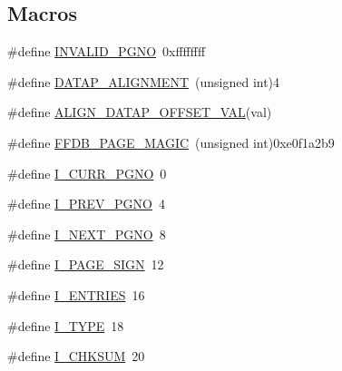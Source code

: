 \subsection*{Macros}
\begin{DoxyCompactItemize}
\item 
\#define \mbox{\hyperlink{adat-devel_2other__libs_2filedb_2filehash_2ffdb__page_8h_a4dac599d4a7d7303608039932d892590}{I\+N\+V\+A\+L\+I\+D\+\_\+\+P\+G\+NO}}~0xffffffff
\item 
\#define \mbox{\hyperlink{adat-devel_2other__libs_2filedb_2filehash_2ffdb__page_8h_a442c3bfb4646a5dd8036ddefcc3c0ed6}{D\+A\+T\+A\+P\+\_\+\+A\+L\+I\+G\+N\+M\+E\+NT}}~(unsigned int)4
\item 
\#define \mbox{\hyperlink{adat-devel_2other__libs_2filedb_2filehash_2ffdb__page_8h_a4892e3ca5c8bfe2debc90616321bf199}{A\+L\+I\+G\+N\+\_\+\+D\+A\+T\+A\+P\+\_\+\+O\+F\+F\+S\+E\+T\+\_\+\+V\+AL}}(val)
\item 
\#define \mbox{\hyperlink{adat-devel_2other__libs_2filedb_2filehash_2ffdb__page_8h_aaa31a771ae4402ac60ba020cd7f9bc46}{F\+F\+D\+B\+\_\+\+P\+A\+G\+E\+\_\+\+M\+A\+G\+IC}}~(unsigned int)0xe0f1a2b9
\item 
\#define \mbox{\hyperlink{adat-devel_2other__libs_2filedb_2filehash_2ffdb__page_8h_a1dcfb11204e968c727054e960f777b1f}{I\+\_\+\+C\+U\+R\+R\+\_\+\+P\+G\+NO}}~0
\item 
\#define \mbox{\hyperlink{adat-devel_2other__libs_2filedb_2filehash_2ffdb__page_8h_ab8f888b11b77cf58f93280a166a07740}{I\+\_\+\+P\+R\+E\+V\+\_\+\+P\+G\+NO}}~4
\item 
\#define \mbox{\hyperlink{adat-devel_2other__libs_2filedb_2filehash_2ffdb__page_8h_a39b0c646434b4dff34463422b1a42055}{I\+\_\+\+N\+E\+X\+T\+\_\+\+P\+G\+NO}}~8
\item 
\#define \mbox{\hyperlink{adat-devel_2other__libs_2filedb_2filehash_2ffdb__page_8h_a24c71248a9f925f7f6e869e7e44c402b}{I\+\_\+\+P\+A\+G\+E\+\_\+\+S\+I\+GN}}~12
\item 
\#define \mbox{\hyperlink{adat-devel_2other__libs_2filedb_2filehash_2ffdb__page_8h_acf7bddf94c7b8dd14d63fe9a16bc1003}{I\+\_\+\+E\+N\+T\+R\+I\+ES}}~16
\item 
\#define \mbox{\hyperlink{adat-devel_2other__libs_2filedb_2filehash_2ffdb__page_8h_a685813f758ad8fb6fad67c0084c5ca09}{I\+\_\+\+T\+Y\+PE}}~18
\item 
\#define \mbox{\hyperlink{adat-devel_2other__libs_2filedb_2filehash_2ffdb__page_8h_a43ab9dfdbc30ecc5327e825522a5541a}{I\+\_\+\+C\+H\+K\+S\+UM}}~20
\item 

\end{DoxyCompactItemize}
